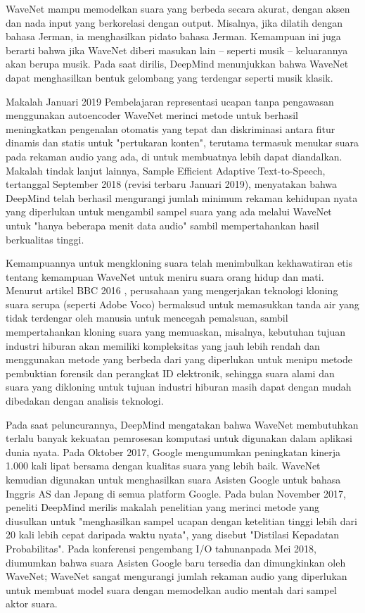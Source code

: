 WaveNet mampu memodelkan suara yang berbeda secara akurat, dengan aksen dan nada input yang berkorelasi dengan output. Misalnya, jika dilatih dengan bahasa Jerman, ia menghasilkan pidato bahasa Jerman. Kemampuan ini juga berarti bahwa jika WaveNet diberi masukan lain – seperti musik – keluarannya akan berupa musik. Pada saat dirilis, DeepMind menunjukkan bahwa WaveNet dapat menghasilkan bentuk gelombang yang terdengar seperti musik klasik.

Makalah Januari 2019 Pembelajaran representasi ucapan tanpa pengawasan menggunakan autoencoder WaveNet merinci metode untuk berhasil meningkatkan pengenalan otomatis yang tepat dan diskriminasi antara fitur dinamis dan statis untuk "pertukaran konten", terutama termasuk menukar suara pada rekaman audio yang ada, di untuk membuatnya lebih dapat diandalkan. Makalah tindak lanjut lainnya, Sample Efficient Adaptive Text-to-Speech, tertanggal September 2018 (revisi terbaru Januari 2019), menyatakan bahwa DeepMind telah berhasil mengurangi jumlah minimum rekaman kehidupan nyata yang diperlukan untuk mengambil sampel suara yang ada melalui WaveNet untuk "hanya beberapa menit data audio" sambil mempertahankan hasil berkualitas tinggi.

Kemampuannya untuk mengkloning suara telah menimbulkan kekhawatiran etis tentang kemampuan WaveNet untuk meniru suara orang hidup dan mati. Menurut artikel BBC 2016 , perusahaan yang mengerjakan teknologi kloning suara serupa (seperti Adobe Voco) bermaksud untuk memasukkan tanda air yang tidak terdengar oleh manusia untuk mencegah pemalsuan, sambil mempertahankan kloning suara yang memuaskan, misalnya, kebutuhan tujuan industri hiburan akan memiliki kompleksitas yang jauh lebih rendah dan menggunakan metode yang berbeda dari yang diperlukan untuk menipu metode pembuktian forensik dan perangkat ID elektronik, sehingga suara alami dan suara yang dikloning untuk tujuan industri hiburan masih dapat dengan mudah dibedakan dengan analisis teknologi.

Pada saat peluncurannya, DeepMind mengatakan bahwa WaveNet membutuhkan terlalu banyak kekuatan pemrosesan komputasi untuk digunakan dalam aplikasi dunia nyata. Pada Oktober 2017, Google mengumumkan peningkatan kinerja 1.000 kali lipat bersama dengan kualitas suara yang lebih baik. WaveNet kemudian digunakan untuk menghasilkan suara Asisten Google untuk bahasa Inggris AS dan Jepang di semua platform Google. Pada bulan November 2017, peneliti DeepMind merilis makalah penelitian yang merinci metode yang diusulkan untuk "menghasilkan sampel ucapan dengan ketelitian tinggi lebih dari 20 kali lebih cepat daripada waktu nyata", yang disebut "Distilasi Kepadatan Probabilitas". Pada konferensi pengembang I/O tahunanpada Mei 2018, diumumkan bahwa suara Asisten Google baru tersedia dan dimungkinkan oleh WaveNet; WaveNet sangat mengurangi jumlah rekaman audio yang diperlukan untuk membuat model suara dengan memodelkan audio mentah dari sampel aktor suara.

